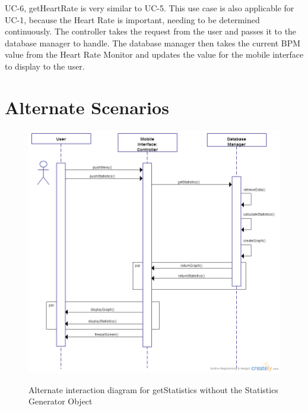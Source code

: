 \documentclass[letterpaper,english, 12pt]{scrreprt}
\begin{document}
UC-6, getHeartRate is very similar to UC-5. This use case is also applicable for UC-1, because the Heart Rate is important, needing to be determined continuously. The controller takes the request from the user and passes it to the database manager to handle. The database manager then takes the current BPM value from the Heart Rate Monitor and updates the value for the mobile interface to display to the user. 


\section{Alternate Scenarios}
\begin{figure}[H]
	\centering
	\includegraphics[scale=.30]{img/Interaction_Diagrams/UC-5_getStatistics.png}\\
	\caption {Alternate interaction diagram for getStatistics without the Statistics Generator Object}

\end{figure}
\end{document}
